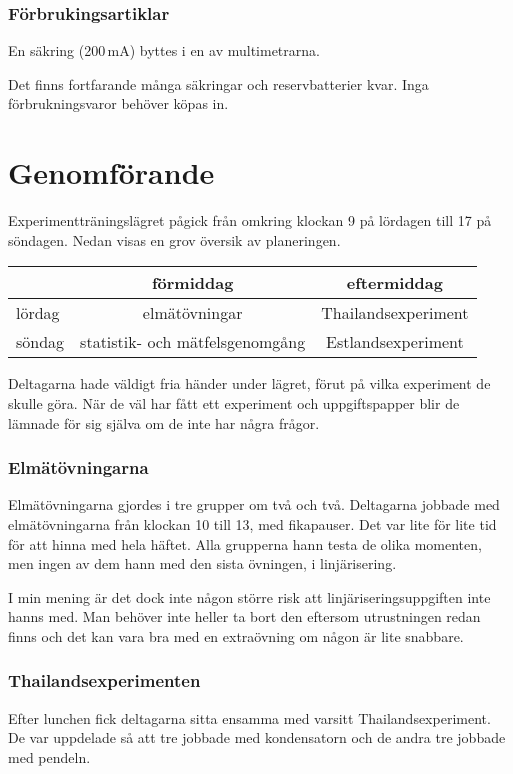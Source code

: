 \documentclass[11pt,a4paper, 
english, swedish %
]{article}
\begin{document}
\subsubsection*{Förbrukingsartiklar}
En säkring (200\,mA) byttes i en av multimetrarna.

Det finns fortfarande många säkringar och reservbatterier kvar. Inga
förbrukningsvaror behöver köpas in. 


\section*{Genomförande}
Experimentträningslägret pågick från omkring klockan 9 på lördagen
till 17 på söndagen. Nedan visas en grov översik av planeringen.
\begin{center}
\begin{tabular}{|l|c|c|}\hline
 & förmiddag &  eftermiddag
\\\hline
lördag & elmätövningar & Thailandsexperiment
\\\hline
söndag & statistik- och mätfelsgenomgång & Estlandsexperiment 
\\\hline
\end{tabular}
\end{center}

Deltagarna hade väldigt fria händer under lägret, förut på vilka
experiment de skulle göra. När de väl har fått ett experiment och
uppgiftspapper blir de lämnade för sig själva om de inte har några
frågor. 

\subsubsection*{Elmätövningarna}
Elmätövningarna gjordes i tre grupper om två och två. Deltagarna
jobbade med elmätövningarna från klockan 10 till 13, med fikapauser. 
Det var lite för lite tid för att hinna med hela häftet. Alla
grupperna hann testa de olika momenten, men ingen av dem hann med
den sista övningen, i linjärisering.  

I min mening
är det dock inte någon större risk att linjäriseringsuppgiften inte
hanns med. Man behöver inte heller ta bort den eftersom utrustningen
redan finns och det kan vara bra med en extraövning om någon är
lite snabbare. 

\subsubsection*{Thailandsexperimenten}
Efter lunchen fick deltagarna sitta ensamma med varsitt
Thailandsexperiment. De var uppdelade så att tre jobbade med
kondensatorn och de andra tre jobbade med pendeln. 
\end{document}
